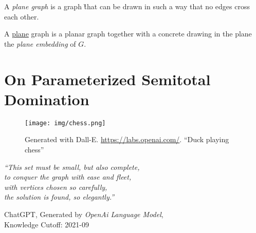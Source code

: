 \begin{graphclass}

A \textit{plane graph} is a graph \G that can be drawn in such a way that no edges cross each other.

A \underline{plane} graph is a planar graph together with a concrete drawing in the plane the \textit{plane embedding} of $G$. 

\end{graphclass}



\chapter{On Parameterized Semitotal Domination}\label{ch:semitotal-domination}

\vspace*{-50pt}

\begin{figure}[ht]
        \texttt{[image: img/chess.png]}
        \captionsetup{textformat=empty,labelformat=blank}
        \caption[Generated with Dalle-E. Knowledge Cutoff 09-2022]{Generated with Dall-E. \url{https://labs.openai.com/}. ``Duck playing chess''}
\end{figure}

\epigraph{\itshape ``This set must be small, but also complete, \\ 
to conquer the
graph with ease and fleet, \\
with vertices chosen so carefully, \\
the solution is found, so elegantly.''
}{ChatGPT, Generated by \emph{OpenAi Language Model}, \\
Knowledge Cutoff: 2021-09}

